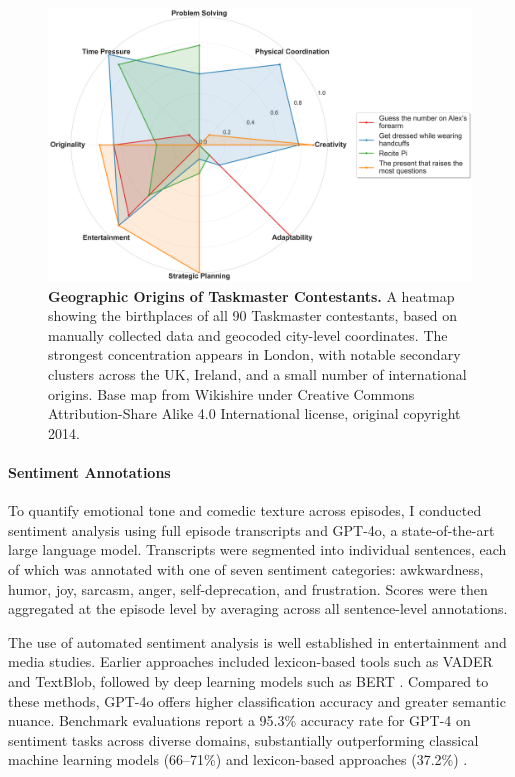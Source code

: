 \documentclass[10pt,letterpaper]{article}
\begin{document}
\begin{figure}[!h]
\centering
\includegraphics[width=\linewidth]{FiguresPNG/Fig4.png}
\caption{{\bf Geographic Origins of Taskmaster Contestants.}
A heatmap showing the birthplaces of all 90 Taskmaster contestants, based on manually collected data and geocoded city-level coordinates. The strongest concentration appears in London, with notable secondary clusters across the UK, Ireland, and a small number of international origins. Base map from Wikishire under Creative Commons Attribution-Share Alike 4.0 International license, original copyright 2014.}
\label{fig:geo_origins}
\end{figure}
\FloatBarrier

\paragraph{Sentiment Annotations}
To quantify emotional tone and comedic texture across episodes, I conducted sentiment analysis using full episode transcripts and GPT-4o, a state-of-the-art large language model. Transcripts were segmented into individual sentences, each of which was annotated with one of seven sentiment categories: awkwardness, humor, joy, sarcasm, anger, self-deprecation, and frustration. Scores were then aggregated at the episode level by averaging across all sentence-level annotations.

The use of automated sentiment analysis is well established in entertainment and media studies. Earlier approaches included lexicon-based tools such as VADER and TextBlob, followed by deep learning models such as BERT \cite{Hutto2014,Devlin2018}. Compared to these methods, GPT-4o offers higher classification accuracy and greater semantic nuance. Benchmark evaluations report a 95.3\% accuracy rate for GPT-4 on sentiment tasks across diverse domains, substantially outperforming classical machine learning models (66–71\%) and lexicon-based approaches (37.2\%) \cite{Fu2024, Debess2024}.
\end{document}
